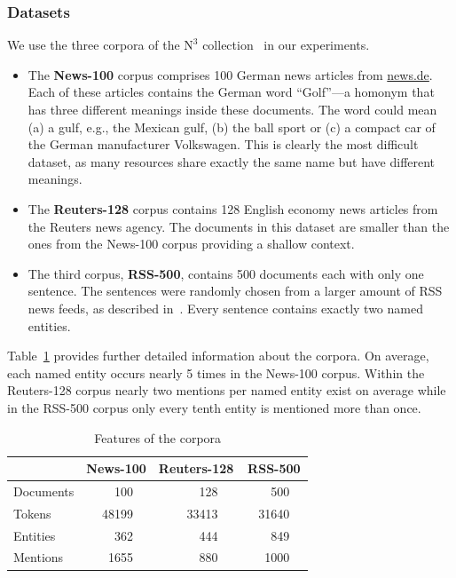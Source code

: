 \subsubsection{Datasets}
We use the three corpora of the $\mbox{N}^3$ collection~\cite{n3} in our experiments.
%
\begin{itemize}
\item The \textbf{News-100} corpus comprises 100 German news articles from \url{news.de}.
Each of these articles contains the German word ``Golf''---a homonym that has three different meanings inside these documents.
The word could mean (a) a gulf, e.g., the Mexican gulf, (b) the ball sport or (c) a compact car of the German manufacturer Volkswagen.
This is clearly the most difficult dataset, as many resources share exactly the same name but have different meanings. 
\item The \textbf{Reuters-128} corpus contains 128 English economy news articles from the Reuters news agency.
The documents in this dataset are smaller than the ones from the News-100 corpus providing a shallow context.
\item The third corpus, \textbf{RSS-500}, contains 500 documents each with only one sentence.
The sentences were randomly chosen from a larger amount of RSS news feeds, as described in~\cite{GER+13}.
Every sentence contains exactly two named entities.
\end{itemize}
Table~\ref{tab:corpusStats} provides further detailed information about the corpora.
On average, each named entity occurs nearly 5 times in the News-100 corpus.
Within the Reuters-128 corpus nearly two mentions per named entity exist on average while in the RSS-500 corpus only every tenth entity is mentioned more than once.


\begin{table}[thb]
    \caption{Features of the corpora}
    \begin{tabular}{lp{0.7cm}rp{0.3cm}p{0.7cm}rp{0.2cm}p{0.6cm}rp{0.3cm}}
    \toprule
     & \multicolumn{3}{c}{\textbf{News-100}} & \multicolumn{3}{c}{\textbf{Reuters-128}} & \multicolumn{3}{c}{\textbf{RSS-500}} \\
    \midrule
    Documents && 100 &&& 128 &&& 500 &\\
	Tokens && 48199 &&& 33413 &&& 31640 &\\
	Entities && 362 &&& 444 &&& 849 &\\
    Mentions && 1655 &&& 880 &&& 1000 &\\
	\bottomrule
	\end{tabular}
	\centering
	\label{tab:corpusStats}
\end{table}

